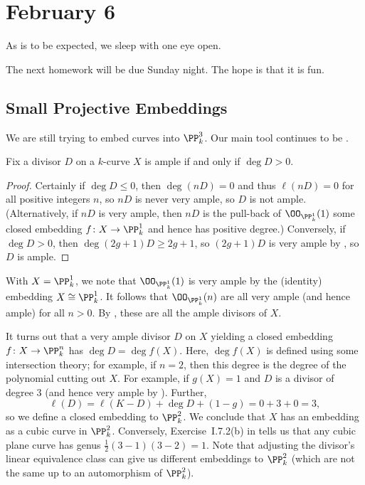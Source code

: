 \documentclass[../notes.tex]{subfiles}
\begin{document}
\section{February 6}

As is to be expected, we sleep with one eye open.
\begin{remark}
	The next homework will be due Sunday night. The hope is that it is fun.
\end{remark}

\subsection{Small Projective Embeddings}
We are still trying to embed curves into $\PP^3_k$. Our main tool continues to be .
\begin{corollary} \label{cor:ample-is-positive}
	Fix a divisor $D$ on a $k$-curve $X$ is ample if and only if $\deg D>0$.
\end{corollary}
\begin{proof}
	Certainly if $\deg D\le0$, then $\deg(nD)=0$ and thus $\ell(nD)=0$ for all positive integers $n$, so $nD$ is never very ample, so $D$ is not ample. (Alternatively, if $nD$ is very ample, then $nD$ is the pull-back of $\OO_{\PP^1_k}(1)$ some closed embedding $f\colon X\to\PP^1_k$ and hence has positive degree.) Conversely, if $\deg D>0$, then $\deg(2g+1)D\ge2g+1$, so $(2g+1)D$ is very ample by , so $D$ is ample.
\end{proof}
\begin{example}
	With $X=\PP^1_k$, we note that $\OO_{\PP^1_k}(1)$ is very ample by the (identity) embedding $X\cong\PP^1_k$. It follows that $\OO_{\PP^1_k}(n)$ are all very ample (and hence ample) for all $n>0$. By , these are all the ample divisors of $X$.
\end{example}
\begin{remark}
	It turns out that a very ample divisor $D$ on $X$ yielding a closed embedding $f\colon X\to\PP^n_k$ has $\deg D=\deg f(X)$. Here, $\deg f(X)$ is defined using some intersection theory; for example, if $n=2$, then this degree is the degree of the polynomial cutting out $X$. For example, if $g(X)=1$ and $D$ is a divisor of degree $3$ (and hence very ample by ). Further,
	\[\ell(D)=\ell(K-D)+\deg D+(1-g)=0+3+0=3,\]
	so we define a closed embedding to $\PP^2_k$. We conclude that $X$ has an embedding as a cubic curve in $\PP^2_k$. Conversely, Exercise~I.7.2(b) in \cite{hartshorne} tells us that any cubic plane curve has genus $\frac12(3-1)(3-2)=1$. Note that adjusting the divisor's linear equivalence class can give us different embeddings to $\PP^2_k$ (which are not the same up to an automorphism of $\PP^2_k$).
\end{remark}
\end{document}
